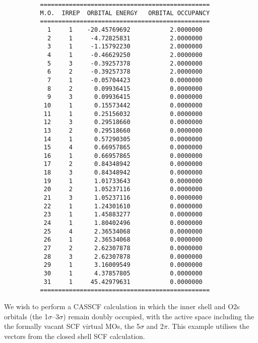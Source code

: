 \documentclass[11pt,fleqn]{article}
\begin{document}
{
\footnotesize
\begin{verbatim}
          ===============================================
          M.O.  IRREP  ORBITAL ENERGY   ORBITAL OCCUPANCY
          ===============================================
            1     1    -20.45769692           2.0000000
            2     1     -4.72825831           2.0000000
            3     1     -1.15792230           2.0000000
            4     1     -0.46629250           2.0000000
            5     3     -0.39257378           2.0000000
            6     2     -0.39257378           2.0000000
            7     1     -0.05704423           0.0000000
            8     2      0.09936415           0.0000000
            9     3      0.09936415           0.0000000
           10     1      0.15573442           0.0000000
           11     1      0.25156032           0.0000000
           12     3      0.29518660           0.0000000
           13     2      0.29518660           0.0000000
           14     1      0.57290305           0.0000000
           15     4      0.66957865           0.0000000
           16     1      0.66957865           0.0000000
           17     2      0.84348942           0.0000000
           18     3      0.84348942           0.0000000
           19     1      1.01733643           0.0000000
           20     2      1.05237116           0.0000000
           21     3      1.05237116           0.0000000
           22     1      1.24301610           0.0000000
           23     1      1.45883277           0.0000000
           24     1      1.80402496           0.0000000
           25     4      2.36534068           0.0000000
           26     1      2.36534068           0.0000000
           27     2      2.62307878           0.0000000
           28     3      2.62307878           0.0000000
           29     1      3.16009549           0.0000000
           30     1      4.37857805           0.0000000
           31     1     45.42979631           0.0000000
          ===============================================
\end{verbatim}
}
We wish to perform a CASSCF calculation in which the
inner shell and O2s orbitals (the 1$\sigma$--3$\sigma$) remain 
doubly occupied, with the active space including the
the formally vacant SCF virtual MOs, the 5$\sigma$
and 2$\pi$. This example
utilises the vectors from the closed shell SCF calculation.
\end{document}

